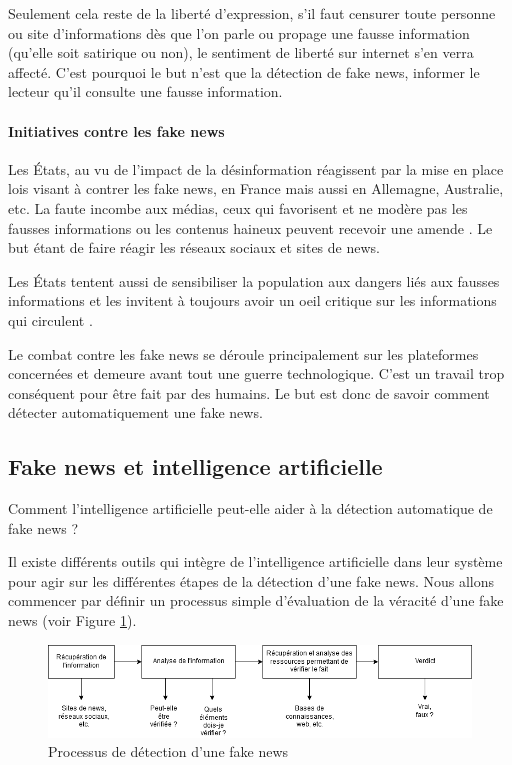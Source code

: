 Seulement cela reste de la liberté d'expression, s'il faut censurer toute personne ou site d'informations dès que l'on parle ou propage une fausse information (qu'elle soit satirique ou non), le sentiment de liberté sur internet s'en verra affecté. C'est pourquoi le but n'est que la détection de fake news, informer le lecteur qu'il consulte une fausse information.

\paragraph{Initiatives contre les fake news}

Les États, au vu de l'impact de la désinformation réagissent par la mise en place lois visant à contrer les fake news, en France mais aussi en Allemagne, Australie, etc. La faute incombe aux médias, ceux qui favorisent et ne modère pas les fausses informations ou les contenus haineux peuvent recevoir une amende \cite{allemagne_fake_news}. Le but étant de faire réagir les réseaux sociaux et sites de news.

Les États tentent aussi de sensibiliser la population aux dangers liés aux fausses informations et les invitent à toujours avoir un oeil critique sur les informations qui circulent \cite{haciyakupoglu2018countering}.

Le combat contre les fake news se déroule principalement sur les plateformes concernées et demeure avant tout une guerre technologique. C'est un travail trop conséquent pour être fait par des humains. Le but est donc de savoir comment détecter automatiquement une fake news. 

\subsection{Fake news et intelligence artificielle}

Comment l'intelligence artificielle peut-elle aider à la détection automatique de fake news ? 

Il existe différents outils qui intègre de l'intelligence artificielle dans leur système pour agir sur les différentes étapes de la détection d'une fake news. Nous allons commencer par définir un processus simple d'évaluation de la véracité d'une fake news (voir Figure \ref{fake_news_process}).

\begin{figure}[ht]
\centering
\includegraphics[width=\textwidth, draft=false]{diagrams/fake_news_process.png}
\caption{Processus de détection d'une fake news}
\label{fake_news_process}
\end{figure}

